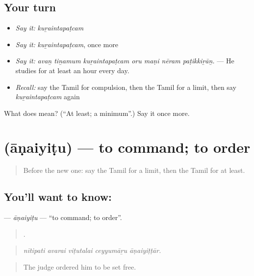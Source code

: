 \subsection*{Your turn}
\begin{itemize}
\raggedright
  \item \emph{Say it:} \emph{kuṟaintapaṭcam}
  \item \emph{Say it:} \emph{kuṟaintapaṭcam}, once more
  \item \emph{Say it:} \emph{avaṉ tiṉamum kuṟaintapaṭcam oru maṇi nēram paṭikkiṟāṉ.} — He studies for at least an hour every day.
  \item \emph{Recall:} say the Tamil for compulsion, then the Tamil for a limit, then say \emph{kuṟaintapaṭcam} again
\end{itemize}

\begin{tcolorbox}[breakable,colback=teal!4,colframe=teal!35!black,title={Before you move on}]
What does  mean? (\textquotedblleft{}At least; a minimum\textquotedblright{}.) Say it once more.
\end{tcolorbox}
\section[\texorpdfstring{\ta{ஆணையிடு} (āṇaiyiṭu)}{ஆணையிடு (āṇaiyiṭu)}]{ (āṇaiyiṭu) — to command; to order}

\label{lesson:TA-C384-anaiyitu}



\begin{quote}
Before the new one: say the Tamil for a limit, then the Tamil for at least.
\end{quote}

\subsection*{You'll want to know: }
\textbf{} — \emph{āṇaiyiṭu} — \textquotedblleft{}to command; to order\textquotedblright{}.

\begin{quote}
    .
\end{quote}

\begin{quote}
\emph{nītipati avarai viṭutalai ceyyumāṟu āṇaiyiṭṭār.}
\end{quote}

\begin{quote}
The judge ordered him to be set free.
\end{quote}

